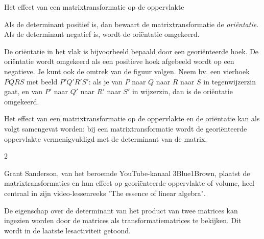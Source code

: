 \begin{lesactiviteit}{Het effect van een matrixtransformatie op de oppervlakte}
    \begin{kader}{}{}
        Als de determinant positief is, dan bewaart de matrixtransformatie de \emph{oriëntatie}. Als de determinant negatief is, wordt de oriëntatie omgekeerd.
        
    De oriëntatie in het vlak is bijvoorbeeld bepaald door een georiënteerde hoek. De oriëntatie wordt omgekeerd als een positieve hoek afgebeeld wordt op een negatieve. Je kunt ook de omtrek van de figuur volgen. Neem bv. een vierhoek $PQRS$ met beeld $P'Q'R'S'$: als je van $P$ naar $Q$ naar $R$ naar $S$ in tegenwijzerzin gaat, en van $P'$ naar $Q'$ naar $R'$ naar $S'$ in wijzerzin, dan is de oriëntatie omgekeerd. 
        

        Het effect van een matrixtransformatie op de oppervlakte en de oriëntatie kan als volgt samengevat worden: bij een matrixtransformatie wordt de georiënteerde oppervlakte vermenigvuldigd met de determinant van de matrix.

        
    \end{kader}
\end{lesactiviteit}

\begin{multicols}{2}

Grant Sanderson, van het beroemde YouTube-kanaal 3Blue1Brown, plaatst de matrixtransformaties en hun effect op georiënteerde oppervlakte of volume, heel centraal in zijn video-lessenreeks "The essence of linear algebra".

De eigenschap over de determinant van het product van twee matrices kan ingezien worden door de matrices als transformatiematrices te bekijken. Dit wordt in de laatste lesactiviteit getoond.
    
\end{multicols}


